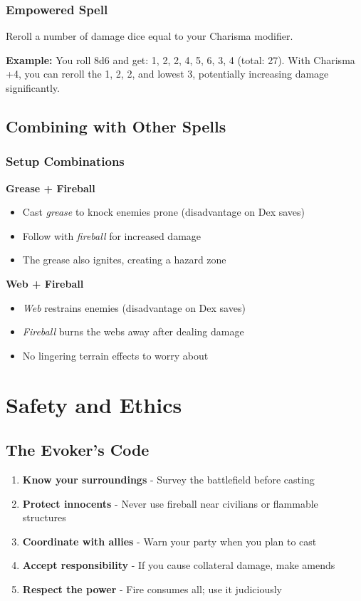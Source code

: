 \documentclass[letterpaper,twocolumn,openany]{dndbook}
\begin{document}
\subsection{Empowered Spell}

Reroll a number of damage dice equal to your Charisma modifier.

\textbf{Example:} You roll 8d6 and get: 1, 2, 2, 4, 5, 6, 3, 4 (total: 27). With Charisma +4, you can reroll the 1, 2, 2, and lowest 3, potentially increasing damage significantly.

\section{Combining with Other Spells}

\subsection{Setup Combinations}

\textbf{Grease + Fireball}
\begin{itemize}
    \item Cast \emph{grease} to knock enemies prone (disadvantage on Dex saves)
    \item Follow with \emph{fireball} for increased damage
    \item The grease also ignites, creating a hazard zone
\end{itemize}

\textbf{Web + Fireball}
\begin{itemize}
    \item \emph{Web} restrains enemies (disadvantage on Dex saves)
    \item \emph{Fireball} burns the webs away after dealing damage
    \item No lingering terrain effects to worry about
\end{itemize}

\chapter{Safety and Ethics}

\section{The Evoker's Code}

\begin{enumerate}
    \item \textbf{Know your surroundings} - Survey the battlefield before casting
    \item \textbf{Protect innocents} - Never use fireball near civilians or flammable structures
    \item \textbf{Coordinate with allies} - Warn your party when you plan to cast
    \item \textbf{Accept responsibility} - If you cause collateral damage, make amends
    \item \textbf{Respect the power} - Fire consumes all; use it judiciously
\end{enumerate}
\end{document}
